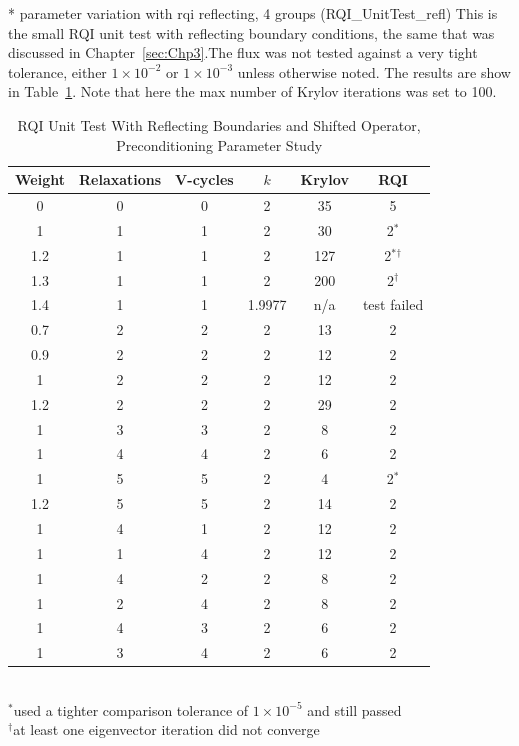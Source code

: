 * parameter variation with rqi reflecting, 4 groups (RQI\_UnitTest\_refl)
This is the small RQI unit test with reflecting boundary conditions, the same that was discussed in Chapter~\ref{sec:Chp3}.The flux was not tested against a very tight tolerance, either $1 \times 10^{-2}$ or $1 \times 10^{-3}$ unless otherwise noted. The results are show in Table~\ref{table:RQIUnitTestRefl}. Note that here the max number of Krylov iterations was set to 100.
%
\begin{table}[!h]
\caption{RQI Unit Test With Reflecting Boundaries and Shifted Operator, Preconditioning Parameter Study}
\begin{center}
\begin{tabular}{c c c c c c}
\hline
Weight & Relaxations & V-cycles & $k$ & Krylov & RQI \\[0.5ex]
\hline
0    & 0 & 0 & 2 & 35   & 5 \\
1    & 1 & 1 & 2 & 30   & 2$^{*}$ \\
1.2 & 1 & 1 & 2 & 127 & 2$^{*}$$^{\dagger}$ \\
1.3 & 1 & 1 & 2 & 200 & 2$^{\dagger}$ \\
1.4 & 1 & 1 & 1.9977  & n/a & test failed \\
\hline
0.7 & 2 & 2 & 2 & 13   & 2 \\
0.9 & 2 & 2 & 2 & 12   & 2 \\
1    & 2 & 2 & 2 & 12   & 2 \\
1.2 & 2 & 2 & 2 & 29   & 2 \\
\hline
1    & 3 & 3 & 2 & 8     & 2 \\
1    & 4 & 4 & 2 & 6     & 2 \\
1    & 5 & 5 & 2 & 4     & 2$^{*}$ \\
1.2 & 5 & 5 & 2 & 14   & 2 \\
\hline
1    & 4 & 1 & 2 & 12   & 2 \\
1    & 1 & 4 & 2 & 12   & 2 \\
1    & 4 & 2 & 2 & 8     & 2 \\
1    & 2 & 4 & 2 & 8     & 2 \\
1    & 4 & 3 & 2 & 6     & 2 \\
1    & 3 & 4 & 2 & 6     & 2 \\
\hline 
\end{tabular}\\
$^{*}$used a tighter comparison tolerance of $1 \times 10^{-5}$ and still passed\\
$^{\dagger}$at least one eigenvector iteration did not converge
\end{center}
\label{table:RQIUnitTestRefl}
\end{table}

